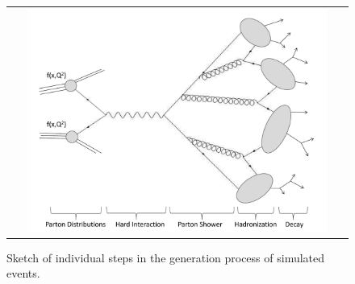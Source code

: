 \begin{figure}[!tp]
  \centering
  \begin{tabular}{c}
    \includegraphics[width=0.9\textwidth]{figures/MCGeneration.pdf} 
  \end{tabular}
  \caption{Sketch of individual steps in the generation process of simulated events.}
  \label{fig:mc_gen}
\end{figure}
